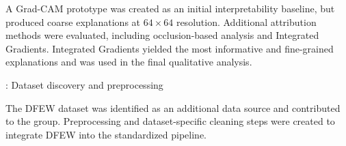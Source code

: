 \begin{description}
    A Grad-CAM prototype was created as an initial interpretability baseline, but produced coarse explanations at $64 \times 64$ resolution. Additional attribution methods were evaluated, including occlusion-based analysis and Integrated Gradients. Integrated Gradients yielded the most informative and fine-grained explanations and was used in the final qualitative analysis.

  \item [Additional dataset contribution]: Dataset discovery and preprocessing

    The DFEW dataset was identified as an additional data source and contributed to the group. Preprocessing and dataset-specific cleaning steps were created to integrate DFEW into the standardized pipeline.
\end{description}
